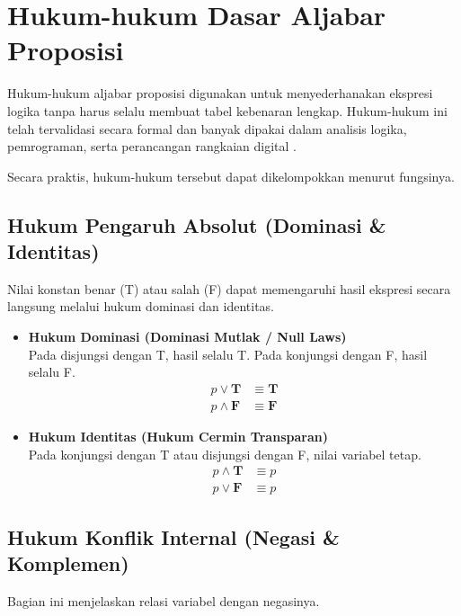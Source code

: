\section{Hukum-hukum Dasar Aljabar Proposisi}

Hukum-hukum aljabar proposisi digunakan untuk menyederhanakan ekspresi logika tanpa harus selalu membuat tabel kebenaran lengkap. Hukum-hukum ini telah tervalidasi secara formal dan banyak dipakai dalam analisis logika, pemrograman, serta perancangan rangkaian digital \cite{rosen2019}.

Secara praktis, hukum-hukum tersebut dapat dikelompokkan menurut fungsinya.

\subsection{Hukum Pengaruh Absolut (Dominasi \& Identitas)}
Nilai konstan benar (T) atau salah (F) dapat memengaruhi hasil ekspresi secara langsung melalui hukum dominasi dan identitas.

\begin{itemize}
    \item \textbf{Hukum Dominasi (Dominasi Mutlak / Null Laws)} \\
    Pada disjungsi dengan T, hasil selalu T. Pada konjungsi dengan F, hasil selalu F.
    \begin{align*}
        p \vee \mathbf{T} &\equiv \mathbf{T} \\
        p \wedge \mathbf{F} &\equiv \mathbf{F}
    \end{align*}

    \item \textbf{Hukum Identitas (Hukum Cermin Transparan)} \\
    Pada konjungsi dengan T atau disjungsi dengan F, nilai variabel tetap.
    \begin{align*}
        p \wedge \mathbf{T} &\equiv p \\
        p \vee \mathbf{F} &\equiv p
    \end{align*}
\end{itemize}

\subsection{Hukum Konflik Internal (Negasi \& Komplemen)}
Bagian ini menjelaskan relasi variabel dengan negasinya.

